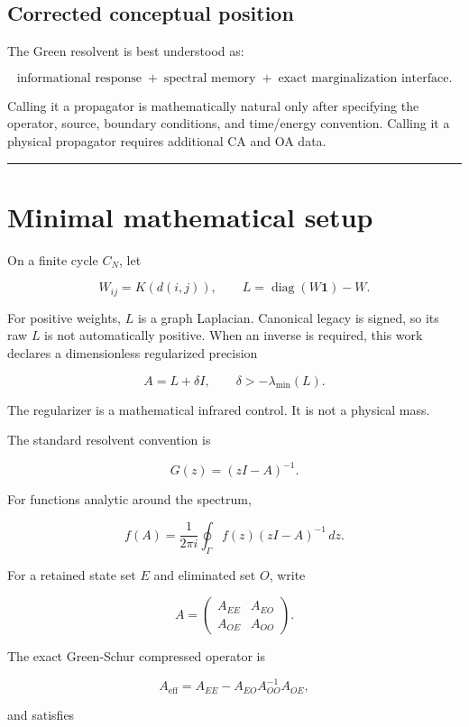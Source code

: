 \documentclass[11pt,a4paper,openany]{report}
\begin{document}
\section{Corrected conceptual position}

The Green resolvent is best understood as:

\[
\text{informational response}
\;+\;
\text{spectral memory}
\;+\;
\text{exact marginalization interface}.
\]

Calling it a propagator is mathematically natural only after specifying the operator, source, boundary conditions, and time/\allowbreak{}energy convention. Calling it a physical propagator requires additional CA and OA data.

\par\medskip\hrule\medskip

\chapter{Minimal mathematical setup}

On a finite cycle \(C_N\), let

\[
W_{ij}=K(d(i,j)),\qquad
L=\operatorname{diag}(W\mathbf 1)-W.
\]

For positive weights, \(L\) is a graph Laplacian. Canonical legacy is signed, so its raw \(L\) is not automatically positive. When an inverse is required, this work declares a dimensionless regularized precision

\[
A=L+\delta I,
\qquad
\delta>-\lambda_{\min}(L).
\]

The regularizer is a mathematical infrared control. It is not a physical mass.

The standard resolvent convention is

\[
G(z)=(zI-A)^{-1}.
\]

For functions analytic around the spectrum,

\[
f(A)=\frac{1}{2\pi i}\oint_\Gamma f(z)(zI-A)^{-1}\,dz.
\]

For a retained state set \(E\) and eliminated set \(O\), write

\[
A=
\begin{pmatrix}
A_{EE}&A_{EO}\\
A_{OE}&A_{OO}
\end{pmatrix}.
\]

The exact Green-Schur compressed operator is

\[
A_{\mathrm{eff}}
=
A_{EE}-A_{EO}A_{OO}^{-1}A_{OE},
\]

and satisfies
\end{document}
